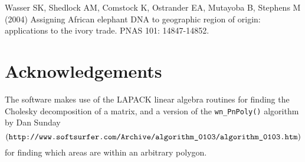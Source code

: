 \documentclass[10pt,titlepage,times,letterpaper]{article}
\begin{document}
Wasser SK, Shedlock AM, Comstock K, Ostrander EA, Mutayoba B, Stephens M (2004)
Assigning African elephant DNA to geographic region of origin:  applications
to the ivory trade.  PNAS 101: 14847-14852.


\section{Acknowledgements}

The software makes use of the LAPACK linear algebra routines for
finding the Cholesky decomposition of a matrix, and a version of the
{\tt wn\_PnPoly()} algorithm by Dan Sunday 
$$(\text{\tt http://www.softsurfer.com/Archive/algorithm\_0103/algorithm\_0103.htm})$$
for finding which areas are within an arbitrary polygon.


%
%
\end{document}
